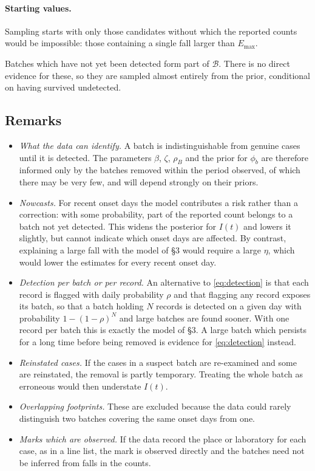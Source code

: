 \documentclass[11pt,a4paper]{article}
\newcommand{\Emax}{E_{\max}}
\begin{document}
\paragraph{Starting values.} Sampling starts with only those candidates
without which the reported counts would be impossible: those containing a
single fall larger than $\Emax$.

Batches which have not yet been detected form part of $\mathcal{B}$. There is
no direct evidence for these, so they are sampled almost entirely from the
prior, conditional on having survived undetected.

\subsection{Remarks}

\begin{itemize}[itemsep=2pt]
\item \emph{What the data can identify.} A batch is indistinguishable from
genuine cases until it is detected. The parameters $\beta$, $\zeta$, $\rho_B$
and the prior for $\phi_b$ are therefore informed only by the batches removed
within the period observed, of which there may be very few, and will depend
strongly on their priors.
\item \emph{Nowcasts.} For recent onset days the model contributes a risk
rather than a correction: with some probability, part of the reported count
belongs to a batch not yet detected. This widens the posterior for $I(t)$ and
lowers it slightly, but cannot indicate which onset days are affected. By
contrast, explaining a large fall with the model of \S3 would require a large
$\eta$, which would lower the estimates for every recent onset day.
\item \emph{Detection per batch or per record.} An alternative to
\eqref{eq:detection} is that each record is flagged with daily probability
$\rho$ and that flagging any record exposes its batch, so that a batch holding
$N$ records is detected on a given day with probability $1-(1-\rho)^N$ and
large batches are found sooner. With one record per batch this is exactly the
model of \S3. A large batch which persists for a long time before being removed
is evidence for \eqref{eq:detection} instead.
\item \emph{Reinstated cases.} If the cases in a suspect batch are re-examined
and some are reinstated, the removal is partly temporary. Treating the whole
batch as erroneous would then understate $I(t)$.
\item \emph{Overlapping footprints.} These are excluded because the data could
rarely distinguish two batches covering the same onset days from one.
\item \emph{Marks which are observed.} If the data record the place or
laboratory for each case, as in a line list, the mark is observed directly and
the batches need not be inferred from falls in the counts.
\end{itemize}
\end{document}
